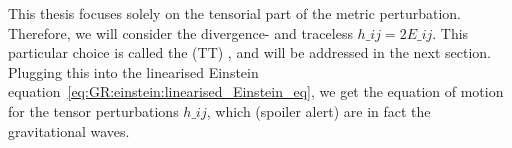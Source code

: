     This thesis focuses solely on the tensorial part of the metric perturbation. Therefore, we will consider the divergence- and traceless $h\_{ij}=2E\_{ij}$. This particular choice is called the  (TT) , and will be addressed in the next section. %
    Plugging this into the linearised Einstein equation~\cref{eq:GR:einstein:linearised_Einstein_eq}, we get the equation of motion for the tensor perturbations $h\_{ij}$, which (spoiler alert) are in fact the gravitational waves.












